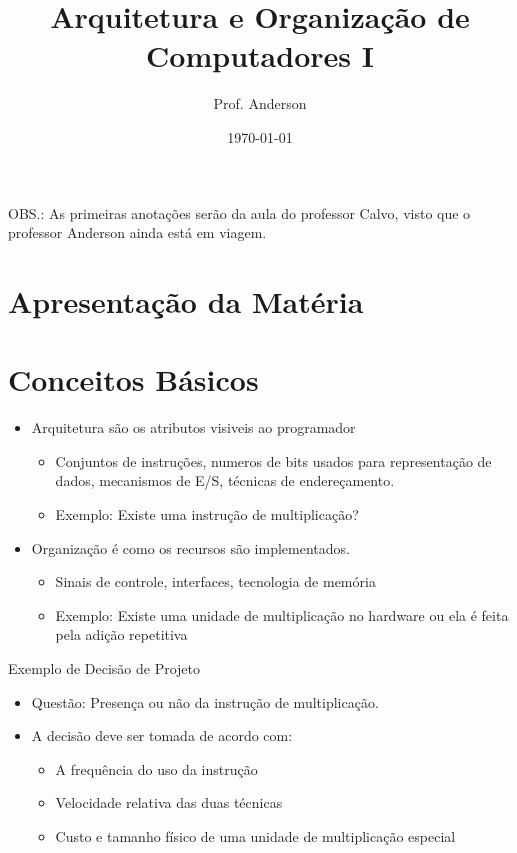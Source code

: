 \documentclass[12pt]{article}
\title{Arquitetura e Organização de Computadores I}
\author{Prof. Anderson}
\date{\today}
\begin{document}
\maketitle
\tableofcontents

\vspace{16pt}
OBS.: As primeiras anotações serão da aula do professor Calvo, visto que o 
professor Anderson ainda está em viagem.

\section{Apresentação da Matéria}

\section{Conceitos Básicos}
\begin{itemize}
    \item Arquitetura são os atributos visiveis ao programador
    \begin{itemize}
        \item Conjuntos de instruções, numeros de bits usados para representação 
        de dados, mecanismos de E/S, técnicas de endereçamento.
        \item Exemplo: Existe uma instrução de multiplicação?
    \end{itemize}
    \item Organização é como os recursos são implementados.
    \begin{itemize}
        \item Sinais de controle, interfaces, tecnologia de memória
        \item Exemplo: Existe uma unidade de multiplicação no hardware ou ela 
        é feita pela adição repetitiva
    \end{itemize}
\end{itemize}

Exemplo de Decisão de Projeto
\begin{itemize}
    \item Questão: Presença ou não da instrução de multiplicação.
    \item A decisão deve ser tomada de acordo com: 
    \begin{itemize}
        \item A frequência do uso da instrução
        \item Velocidade relativa das duas técnicas
        \item Custo e tamanho físico de uma unidade de multiplicação especial
    \end{itemize}
\end{itemize}
\end{document}
